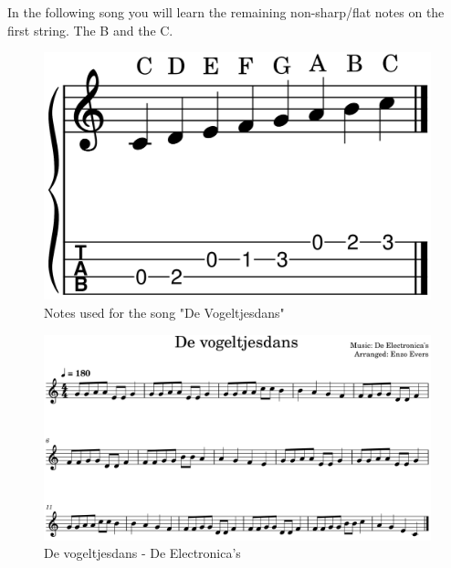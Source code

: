 
\newpage

In the following song you will learn the remaining non-sharp/flat notes on the first string. The B and the C.

\begin{figure}[h]
	\centering
	\includegraphics[height=0.12\textheight]{../../MuseScore/Ukulele/UkuleleNotesUsedInVogeltjesdans.png}
	\caption{Notes used for the song "De Vogeltjesdans"}
	\label{fig:ukulele_notes_for_vogeltjesdans}
\end{figure}


\begin{figure}[h]
	\centering
	\includegraphics[width=\textwidth]{../../MuseScore/Ukulele/UkuleleVogeltjesdansDeElectronicas.png}
	\caption{De vogeltjesdans - De Electronica's}
	\label{fig:ukulele_vogeltjesdans}
\end{figure}


